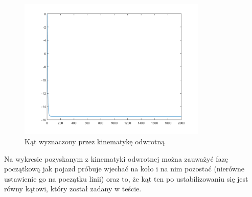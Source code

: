 \documentclass[a4paper, 12pt]{report}
\begin{document}
				\begin{figure}[H]
					\centering
					\includegraphics[width = 0.8\textwidth]{./AP/img/step_2_in_3.png}
					\caption{Kąt wyznaczony przez kinematykę odwrotną}
				\end{figure}
				\noindent Na wykresie pozyskanym z kinematyki odwrotnej można zauważyć fazę początkową jak pojazd próbuje wjechać na koło i na nim pozostać (nierówne ustawienie go na początku linii) oraz to, że kąt ten po ustabilizowaniu się jest równy kątowi, który został zadany w teście.
			\newpage
\end{document}
